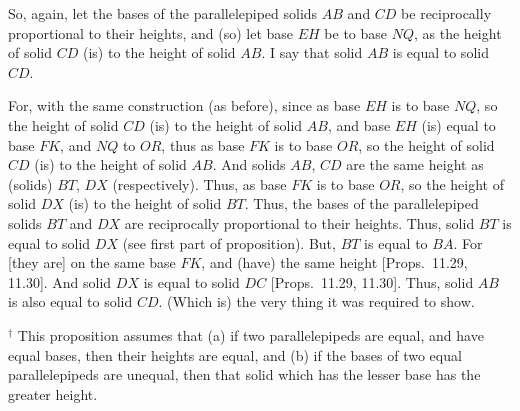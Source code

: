 \begin{Parallel}{}{}
{So, again, let the bases of the parallelepiped solids $AB$ and $CD$ be
reciprocally proportional to their heights, and (so) let base $EH$ be to base $NQ$,
as the height of solid $CD$ (is) to the height of solid $AB$. I say
that solid $AB$ is equal to solid $CD$.

For, with the same construction (as before), since as base $EH$
is to base $NQ$, so the height of solid $CD$ (is) to the height
of solid $AB$, and base $EH$ (is) equal to base $FK$, and
$NQ$ to $OR$, thus as base $FK$ is to base $OR$, so the height
of solid $CD$ (is) to the height of solid $AB$. And solids $AB$, $CD$ are the same height as (solids) $BT$,  $DX$ (respectively). 
Thus, as base $FK$ is to base $OR$, so the height of solid $DX$ (is)
to the height of solid $BT$. Thus, the bases of the parallelepiped solids $BT$ and $DX$
are reciprocally proportional to their heights. Thus, solid $BT$ is equal to
solid $DX$ (see first part of  proposition). But, $BT$ is equal to $BA$. For [they are] on the same
base $FK$, and (have) the same height [Props.~11.29, 11.30]. And solid $DX$ is equal
to solid $DC$ [Props.~11.29, 11.30]. Thus, solid $AB$ is also equal to solid $CD$. (Which is) the very thing it was required to show.}
\end{Parallel}
{\footnotesize\noindent$^\dag$ This proposition assumes that (a) if
two parallelepipeds are equal, and have equal bases, then their heights are equal,
and (b) if the bases of two equal parallelepipeds are unequal, then that solid which
has the lesser base has the greater height.}

